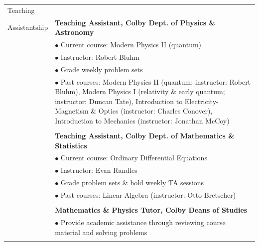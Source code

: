 \documentclass[10pt]{article}
\begin{document}
\begin{longtable}{ l m{13.5cm}   }
   
     					
     					

     					   		   					 
     					 
  \large{Teaching}   	& \\ 
  \large{Assistantship} & \textbf{Teaching Assistant, Colby Dept. of Physics \& Astronomy} \\
  						& $\bullet$ Current course: Modern Physics II (quantum)\\
    					& $\bullet$ Instructor: Robert Bluhm \\
    					& $\bullet$ Grade weekly problem sets \\ 
     					& $\bullet$ Past courses: Modern Physics II (quantum; instructor: Robert Bluhm), Modern Physics I (relativity \& early quantum; instructor: Duncan Tate), Introduction to Electricity-Magnetism \& Optics (instructor: Charles Conover), Introduction to Mechanics (instructor: Jonathan McCoy)\\
     					& \\
     					 
     					& \textbf{Teaching Assistant, Colby Dept. of Mathematics \& Statistics} \\
     					& $\bullet$ Current course: Ordinary Differential Equations\\
     					& $\bullet$ Instructor: Evan Randles \\
     					& $\bullet$ Grade problem sets \& hold weekly TA sessions \\ %
     					& $\bullet$ Past courses: Linear Algebra (instructor: Otto Bretscher)\\
     					& \\
     					 
     					& \textbf{Mathematics \& Physics Tutor, Colby Deans of Studies} \\
     					&  $\bullet$ Provide academic assistance through reviewing course material and solving problems \\
     					& \\
     					 
     					 
     					 
  
     				 	 
  
  
  						 
  						 

\end{longtable}
\end{document}
